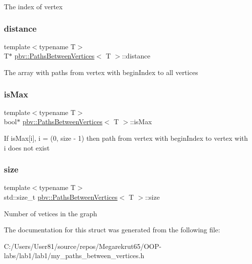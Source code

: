 The index of vertex \mbox{\label{structpbv_1_1_paths_between_vertices_a67aed042aa649d2b6dfeee29d3ec6416}} 
\subsubsection{\texorpdfstring{distance}{distance}}
{\footnotesize\ttfamily template$<$typename T$>$ \\
T$\ast$ \mbox{\hyperlink{structpbv_1_1_paths_between_vertices}{pbv\+::\+Paths\+Between\+Vertices}}$<$ T $>$\+::distance}

The array with paths from vertex with \textquotesingle{}begin\+Index\textquotesingle{} to all vertices \mbox{\label{structpbv_1_1_paths_between_vertices_a8d7391a03771f17ca699f519e64bf2a4}} 
\subsubsection{\texorpdfstring{is\+Max}{isMax}}
{\footnotesize\ttfamily template$<$typename T$>$ \\
bool$\ast$ \mbox{\hyperlink{structpbv_1_1_paths_between_vertices}{pbv\+::\+Paths\+Between\+Vertices}}$<$ T $>$\+::is\+Max}

If is\+Max\mbox{[}i\mbox{]}, i = (0, \textquotesingle{}size\textquotesingle{} -\/ 1) then path from vertex with \textquotesingle{}begin\+Index\textquotesingle{} to vertex with \textquotesingle{}i\textquotesingle{} does not exist \mbox{\label{structpbv_1_1_paths_between_vertices_a7ffee986b1b7f57a881a883b58bc67f4}} 
\subsubsection{\texorpdfstring{size}{size}}
{\footnotesize\ttfamily template$<$typename T$>$ \\
std\+::size\+\_\+t \mbox{\hyperlink{structpbv_1_1_paths_between_vertices}{pbv\+::\+Paths\+Between\+Vertices}}$<$ T $>$\+::size}

Number of vetices in the graph 

The documentation for this struct was generated from the following file\+:\begin{DoxyCompactItemize}
\item 
C\+:/\+Users/\+User81/source/repos/\+Megarekrut65/\+O\+O\+P-\/labs/lab1/lab1/my\+\_\+paths\+\_\+between\+\_\+vertices.\+h\end{DoxyCompactItemize}
